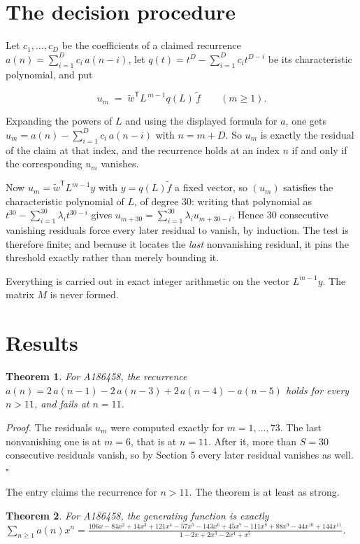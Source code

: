\documentclass[11pt]{article}
\newtheorem{theorem}{Theorem}
\theoremstyle{definition}
\begin{document}
\section{The decision procedure}

Let $c_1,\dots,c_D$ be the coefficients of a claimed recurrence $a(n) = \sum_{i=1}^{D} c_i\,a(n-i)$, let $q(t) = t^{D} - \sum_{i=1}^{D} c_i t^{D-i}$ be its characteristic polynomial, and put

\[u_m \;=\; \tilde w^{\mathsf T} L^{\,m-1} q(L)\,\tilde f \qquad (m \ge 1).\]

Expanding the powers of $L$ and using the displayed formula for $a$, one gets $u_m = a(n) - \sum_{i=1}^{D} c_i\,a(n-i)$ with $n = m + D$. So $u_m$ is exactly the residual of the claim at that index, and the recurrence holds at an index $n$ if and only if the corresponding $u_m$ vanishes.

Now $u_m = \tilde w^{\mathsf T} L^{m-1} y$ with $y = q(L)\tilde f$ a fixed vector, so $(u_m)$ satisfies the characteristic polynomial of $L$, of degree $30$: writing that polynomial as $t^{30} - \sum_{i=1}^{30} \lambda_i t^{30-i}$ gives $u_{m+30} = \sum_{i=1}^{30} \lambda_i u_{m+30-i}$. Hence $30$ consecutive vanishing residuals force every later residual to vanish, by induction. The test is therefore finite; and because it locates the {\itshape last} nonvanishing residual, it pins the threshold exactly rather than merely bounding it.

Everything is carried out in exact integer arithmetic on the vector $L^{m-1}y$. The matrix $M$ is never formed.

\section{Results}

\begin{theorem} For A186458, the recurrence $a(n) = 2\,a(n-1) - 2\,a(n-3) + 2\,a(n-4) - a(n-5)$ holds for every $n > 11$, and fails at $n = 11$.\end{theorem}

{\itshape Proof.} The residuals $u_m$ were computed exactly for $m = 1,\dots,73$. The last nonvanishing one is at $m = 6$, that is at $n = 11$. After it, more than $S = 30$ consecutive residuals vanish, so by Section 5 every later residual vanishes as well. $\square$

The entry claims the recurrence for $n > 11$. The theorem is at least as strong.

\begin{theorem} For A186458, the generating function is exactly $\sum_{n\ge 1} a(n)x^n = \frac{106x - 84x^{2} + 14x^{3} + 121x^{4} - 57x^{5} - 143x^{6} + 45x^{7} - 111x^{8} + 88x^{9} - 44x^{10} + 144x^{11}}{1 - 2x + 2x^{3} - 2x^{4} + x^{5}}$.\end{theorem}
\end{document}
